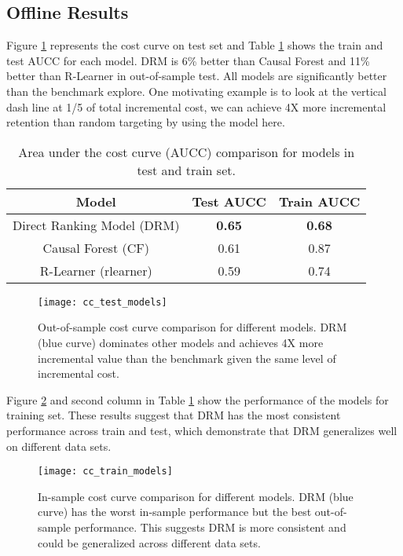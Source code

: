 \subsection{Offline Results}
Figure \ref{fig:cc_test_models} represents the cost curve on test set and Table \ref{tab:2} shows the train and test AUCC for each model. DRM is 6\% better than Causal Forest and 11\% better than R-Learner in out-of-sample test. All models are significantly better than the benchmark explore. One motivating example is to look at the vertical dash line at 1/5 of total incremental cost, we can achieve 4X more incremental retention than random targeting by using the model here.
\begin{table}
  \caption{Area under the cost curve (AUCC) comparison for models in test and train set.}
  \label{tab:2}
  \begin{tabular}{ccc}
    \toprule
    Model & Test AUCC & Train AUCC\\
    \midrule
    Direct Ranking Model (DRM) & \textbf{0.65} & \textbf{0.68}\\
    Causal Forest (CF) & 0.61 & 0.87\\
    R-Learner (rlearner) & 0.59 & 0.74\\
  \bottomrule
\end{tabular}
\end{table}
\begin{figure}
\texttt{[image: cc\_test\_models]}
\caption{Out-of-sample cost curve comparison for different models. DRM (blue curve) dominates other models and achieves 4X more incremental value than the benchmark given the same level of incremental cost.}
\label{fig:cc_test_models}
\end{figure}

Figure \ref{fig:cc_train_models} and second column in Table \ref{tab:2} show the performance of the models for training set. These results suggest that DRM has the most consistent performance across train and test, which demonstrate that DRM generalizes well on different data sets.

\begin{figure}
\texttt{[image: cc\_train\_models]}
\caption{In-sample cost curve comparison for different models. DRM (blue curve) has the worst in-sample performance but the best out-of-sample performance. This suggests DRM is more consistent and could be generalized across different data sets.}
\label{fig:cc_train_models}
\end{figure}

